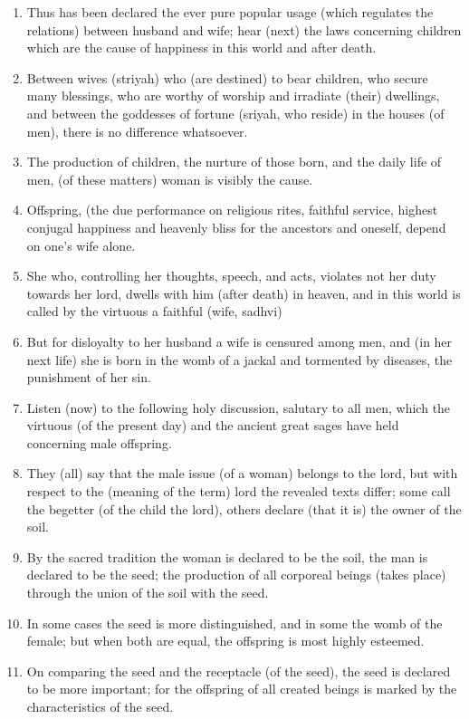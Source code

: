 \begin{enumerate}
\item Thus has been declared the ever pure popular usage (which regulates the relations) between husband and wife; hear (next) the laws concerning children which are the cause of happiness in this world and after death.
\item Between wives (striyah) who (are destined) to bear children, who secure many blessings, who are worthy of worship and irradiate (their) dwellings, and between the goddesses of fortune (sriyah, who reside) in the houses (of men), there is no difference whatsoever.
\item The production of children, the nurture of those born, and the daily life of men, (of these matters) woman is visibly the cause.
\item Offspring, (the due performance on religious rites, faithful service, highest conjugal happiness and heavenly bliss for the ancestors and oneself, depend on one's wife alone.
\item She who, controlling her thoughts, speech, and acts, violates not her duty towards her lord, dwells with him (after death) in heaven, and in this world is called by the virtuous a faithful (wife, sadhvi)
\item But for disloyalty to her husband a wife is censured among men, and (in her next life) she is born in the womb of a jackal and tormented by diseases, the punishment of her sin.
\item Listen (now) to the following holy discussion, salutary to all men, which the virtuous (of the present day) and the ancient great sages have held concerning male offspring.
\item They (all) say that the male issue (of a woman) belongs to the lord, but with respect to the (meaning of the term) lord the revealed texts differ; some call the begetter (of the child the lord), others declare (that it is) the owner of the soil.
\item By the sacred tradition the woman is declared to be the soil, the man is declared to be the seed; the production of all corporeal beings (takes place) through the union of the soil with the seed.
\item In some cases the seed is more distinguished, and in some the womb of the female; but when both are equal, the offspring is most highly esteemed.
\item On comparing the seed and the receptacle (of the seed), the seed is declared to be more important; for the offspring of all created beings is marked by the characteristics of the seed.

\end{enumerate}
